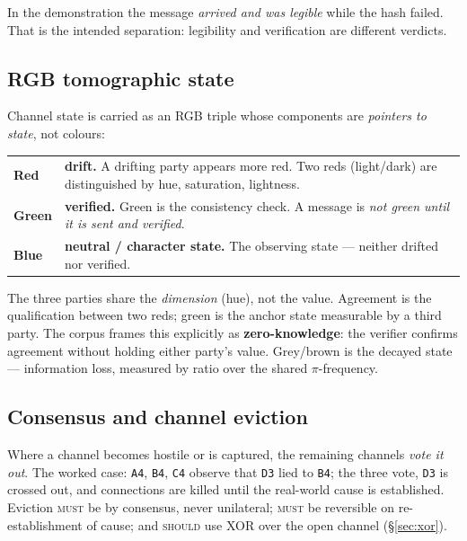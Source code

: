 \documentclass[11pt,a4paper]{article}
\newcommand{\MUST}{\textsc{must}}
\newcommand{\SHOULD}{\textsc{should}}
\begin{document}
In the demonstration the message \emph{arrived and was legible} while the hash
failed. That is the intended separation: legibility and verification are
different verdicts.

\subsection{RGB tomographic state}
\label{sec:rgb}

Channel state is carried as an RGB triple whose components are \emph{pointers to
state}, not colours:

\begin{center}
\begin{tabular}{@{}lp{10.0cm}@{}}
\toprule
\textbf{Red} & \textbf{drift.} A drifting party appears more red. Two reds
  (light/dark) are distinguished by hue, saturation, lightness. \\
\textbf{Green} & \textbf{verified.} Green is the consistency check. A message is
  \emph{not green until it is sent and verified}. \\
\textbf{Blue} & \textbf{neutral / character state.} The observing state ---
  neither drifted nor verified. \\
\bottomrule
\end{tabular}
\end{center}

The three parties share the \emph{dimension} (hue), not the value. Agreement is
the qualification between two reds; green is the anchor state measurable by a
third party. The corpus frames this explicitly as \textbf{zero-knowledge}: the
verifier confirms agreement without holding either party's value. Grey/brown is
the decayed state --- information loss, measured by ratio over the shared
$\pi$-frequency.

\subsection{Consensus and channel eviction}

Where a channel becomes hostile or is captured, the remaining channels
\emph{vote it out}. The worked case: \texttt{A4}, \texttt{B4}, \texttt{C4}
observe that \texttt{D3} lied to \texttt{B4}; the three vote, \texttt{D3} is
crossed out, and connections are killed until the real-world cause is
established. Eviction \MUST{} be by consensus, never unilateral; \MUST{} be
reversible on re-establishment of cause; and \SHOULD{} use XOR over the open
channel (\S\ref{sec:xor}).
\end{document}

